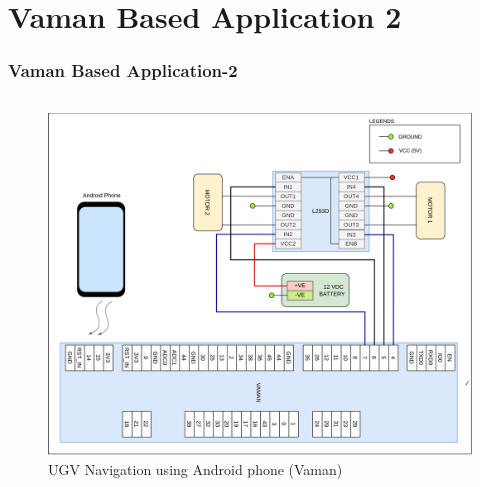 \documentclass[xcolor=table]{beamer}
\begin{document}
\section{Vaman Based Application 2}
\begin{frame}
\frametitle{Vaman Based Application-2}
\begin{columns}
	\begin{figure}[h!]
  		\centering
  		\includegraphics[width=\linewidth]{./figs/Wiring_UGV_phone_vaman.png}
  		\caption{UGV Navigation using Android phone (Vaman)}
  		\label{Wiring_UGV_phone_vaman}
	\end{figure}
\end{columns}
\end{frame}
\end{document}
